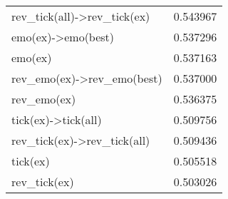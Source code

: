 \begin{table}
\begin{tabular}{lS}
rev_tick(all)->rev_tick(ex) & 0.543967 \\
emo(ex)->emo(best) & 0.537296 \\
emo(ex) & 0.537163 \\
rev_emo(ex)->rev_emo(best) & 0.537000 \\
rev_emo(ex) & 0.536375 \\
tick(ex)->tick(all) & 0.509756 \\
rev_tick(ex)->rev_tick(all) & 0.509436 \\
tick(ex) & 0.505518 \\
rev_tick(ex) & 0.503026 \\
\bottomrule
\end{tabular}
\end{table}
